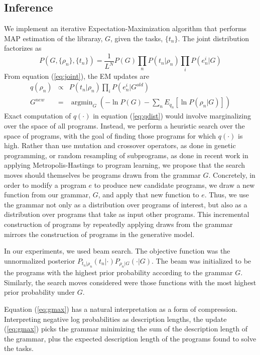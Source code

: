\documentclass{article} %
\begin{document}
\subsection{Inference}
We implement an iterative Expectation-Maximization algorithm that performs MAP estimation of the libraray, $G$, given the tasks, $\{t_n\}$.
The joint distribution factorizes as
\begin{equation}
P(G,\{\rho_n\},\{t_n\}) = \frac{1}{L^N} P(G) \prod_n P(t_n | \rho_n) \prod_i P(e^i_n | G)
\label{eq:joint}
\end{equation}
From equation (\ref{eq:joint}), the EM updates are
\begin{eqnarray}
q(\rho_n) &\propto& P(t_n | \rho_n) \prod_i P(e^i_n | G^{old})\\
\label{eq:qdist}
G^{new} &=& \operatorname{argmin}_G \left( -\ln P(G) -
\sum_n 
E_{q_n}
 \left[ \ln P(\rho_n | G) \right] \right)
 \label{eq:gmax}
\end{eqnarray}
Exact computation of $q(\cdot)$ in equation (\ref{eq:qdist}) would involve marginalizing over the space of all programs.
Instead, we perform a heuristic search over the space of programs, with the goal of finding those programs for which $q(\cdot)$ is high.
Rather than use mutation and crossover operators, as done in genetic programming, or random resampling of subprograms, as done in recent work in applying Metropolis-Hastings to program learning, we propose that the search moves should themselves be programs drawn from the grammar $G$.
Concretely, in order to modify a program $e$ to produce new candidate programs, we draw a new function from our grammar, $G$, and apply that new function to $e$.
Thus, we use the grammar not only as a distribution over programs of interest, but also as a distribution over programs that take as input other programs.
This incremental construction of programs by repeatedly applying draws from the grammar mirrors the construction of programs in the generative model.

In our experiments, we used beam search. The objective function was the unnormalized posterior $P_{t_n|\rho_n}(t_n | \cdot )P_{\rho_n | G}(\cdot | G)$.
The beam was initialized to be the programs with the highest prior probability according to the grammar $G$.
Similarly, the search moves considered were those functions with the most highest prior probability under $G$.

Equation (\ref{eq:gmax}) has a natural interpretation as a form of compression.
Interpreting negative log probabilities as description lengths, the update (\ref{eq:gmax}) picks the grammar minimizing the sum of the description length of the grammar, plus the expected description length of the programs found to solve the tasks.
\end{document}
